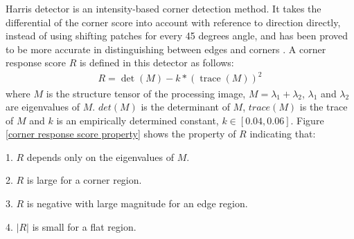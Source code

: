 \documentclass[letterpaper, 10 pt, conference]{ieeeconf}  %
\begin{document}
Harris detector \cite{Harris1988A} is an intensity-based corner detection method. It takes the differential of the corner score into account with reference to direction directly, instead of using shifting patches for every 45 degrees angle, and has been proved to be more accurate in distinguishing between edges and corners \cite{Dey2012A}. A corner response score ${R}$ is defined in this detector as follows:
\begin{equation}
\begin{split}
R = \operatorname { det } ( M ) - k*( \operatorname { trace } ( M ) ) ^ { 2 }
\end{split}
\label{corner response score}
\end{equation}
where ${M}$ is the structure tensor of the processing image, ${M=\lambda _ { 1 }+\lambda _ { 2 }}$, ${\lambda _ {1}}$ and ${\lambda _ {2}}$ are eigenvalues of ${M}$. ${det(M)}$ is the determinant of ${M}$, ${trace(M)}$ is the trace of ${M}$ and ${k}$ is an empirically determined constant, ${k \in [ 0.04,0.06 ]}$. Figure \ref{corner response score property} shows the property of ${R}$ indicating that:

1. ${R}$ depends only on the eigenvalues of ${M}$.

2. ${R}$ is large for a corner region.

3. ${R}$ is negative with large magnitude for an edge region.

4. ${|R|}$ is small for a flat region.
\end{document}

